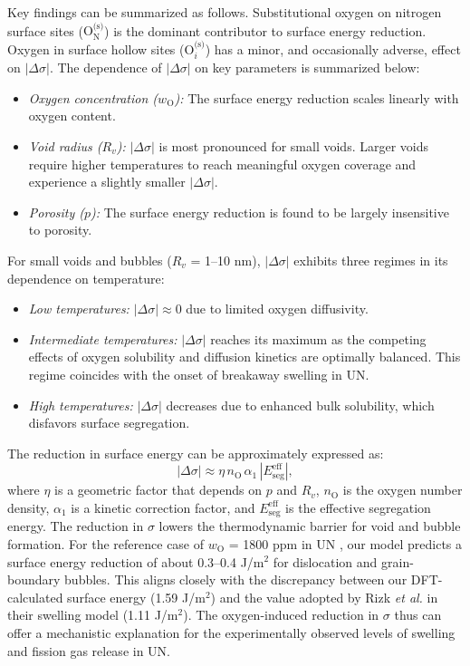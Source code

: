\documentclass[preprint,12pt,sort&compress]{elsarticle}
\newcommand{\?}{\stackrel{?}{=}}
\begin{document}
Key findings can be summarized as follows. Substitutional oxygen on nitrogen surface sites ($\text{O}_\text{N}^\text{(s)}$) is the dominant contributor to surface energy reduction. Oxygen in surface hollow sites ($\text{O}_i^\text{(s)}$) has a minor, and occasionally adverse, effect on $|\Delta \sigma|$. The dependence of $|\Delta \sigma|$ on key parameters is summarized below:
\begin{itemize}
    \item \textit{Oxygen concentration ($w_\text{O}$):} The surface energy reduction scales linearly with oxygen content.
    \item \textit{Void radius ($R_v$):} $|\Delta \sigma|$ is most pronounced for small voids. Larger voids require higher temperatures to reach meaningful oxygen coverage and experience a slightly smaller $|\Delta \sigma|$.
    \item \textit{Porosity ($p$):} The surface energy reduction is found to be largely insensitive to porosity.
    \end{itemize}

\vspace{0.5cm}

For small voids and bubbles ($R_v$ = 1--10 nm), $|\Delta \sigma|$ exhibits three regimes in its dependence on temperature:
    \begin{itemize}
    \item \textit{Low temperatures:} $|\Delta \sigma| \approx 0$ due to limited oxygen diffusivity.
    \item \textit{Intermediate temperatures:} $|\Delta \sigma|$ reaches its maximum as the competing effects of oxygen solubility and diffusion kinetics are optimally balanced. This regime coincides with the onset of breakaway swelling in UN.
    \item \textit{High temperatures:} $|\Delta \sigma|$ decreases due to enhanced bulk solubility, which disfavors surface segregation.
    \end{itemize}

The reduction in surface energy can be approximately expressed as:
\[
|\Delta \sigma| \approx \eta \, n_\text{O} \, \alpha_1 \, |E_\text{seg}^\text{eff}|,
\]
where $\eta$ is a geometric factor that depends on $p$ and $R_v$, $n_\text{O}$ is the oxygen number density, $\alpha_1$ is a kinetic correction factor, and $E_\text{seg}^\text{eff}$ is the effective segregation energy. The reduction in $\sigma$ lowers the thermodynamic barrier for void and bubble formation. For the reference case of $w_\text{O}$ = 1800 ppm in UN \cite{Ronchi1975}, our model predicts a surface energy reduction of about 0.3--0.4 J/m$^2$ for dislocation and grain-boundary bubbles. This aligns closely with the discrepancy between our DFT-calculated surface energy (1.59 J/m$^2$) and the value adopted by Rizk \textit{et al.} \cite{Rizk2025} in their swelling model (1.11 J/m$^2$). The oxygen-induced reduction in $\sigma$ thus can offer a mechanistic explanation for the experimentally observed levels of swelling and fission gas release in UN. %
\end{document}
